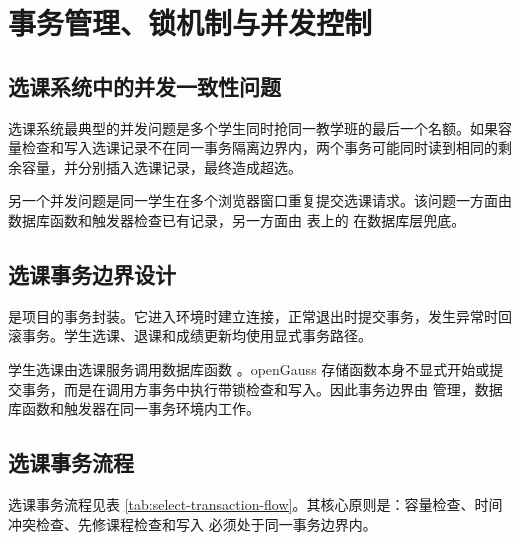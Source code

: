 \chapter{事务管理、锁机制与并发控制}

\section{选课系统中的并发一致性问题}

选课系统最典型的并发问题是多个学生同时抢同一教学班的最后一个名额。如果容量检查和写入选课记录不在同一事务隔离边界内，两个事务可能同时读到相同的剩余容量，并分别插入选课记录，最终造成超选。

另一个并发问题是同一学生在多个浏览器窗口重复提交选课请求。该问题一方面由数据库函数和触发器检查已有记录，另一方面由  表上的  在数据库层兜底。

\section{选课事务边界设计}

 是项目的事务封装。它进入环境时建立连接，正常退出时提交事务，发生异常时回滚事务。学生选课、退课和成绩更新均使用显式事务路径。

学生选课由选课服务调用数据库函数 。openGauss 存储函数本身不显式开始或提交事务，而是在调用方事务中执行带锁检查和写入。因此事务边界由  管理，数据库函数和触发器在同一事务环境内工作。

\section{选课事务流程}

选课事务流程见表 \ref{tab:select-transaction-flow}。其核心原则是：容量检查、时间冲突检查、先修课程检查和写入  必须处于同一事务边界内。

